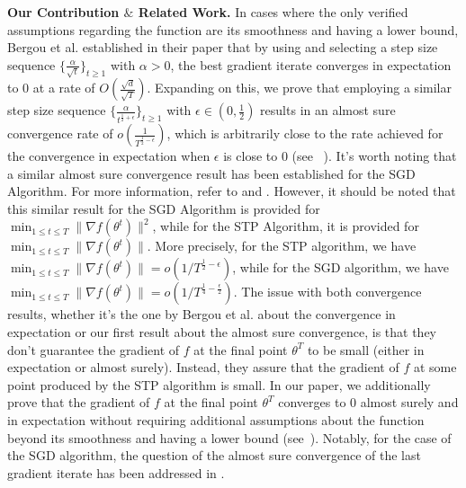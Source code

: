 \documentclass{article} %
\begin{document}
\textbf{Our Contribution $\&$ Related Work.}
In cases where the only verified assumptions regarding the function are its smoothness and having a lower bound, Bergou et al. established in their paper \cite[Theorem 4.1]{bergou2020stochastic} that by using  and selecting a step size sequence $\{\frac{\alpha}{\sqrt{t}}\}_{t \ge 1 }$ with $\alpha>0$, the best gradient iterate converges in expectation to $0$ at a rate of $O(\frac{\sqrt{d}}{\sqrt{T}}).$  Expanding on this, we prove that employing a similar step size sequence $\{\frac{\alpha}{t^{\frac{1}{2}+\epsilon} }\}_{t \ge 1}$ with $\epsilon \in (0,\frac{1}{2})$  results in an almost sure convergence rate of $o(\frac{1}{T^{\frac{1}{2}-\epsilon }} )  $, which is arbitrarily close to the rate achieved for the convergence in expectation when $\epsilon$ is close to $0$ (see ~). It's worth noting that a similar almost sure convergence result has been established for the SGD Algorithm. For more information, refer to \cite[Corollary 18]{sebbouh2021almost} and   \cite[Theorem 1]{liu2022almost}. However, it should be noted that this similar result for the SGD Algorithm is provided for $\min_{1 \le t \le T} \lVert \nabla f(\theta^t) \rVert^2$, while for the STP Algorithm, it is provided for $\min_{1 \le t \le T} \lVert \nabla f(\theta^t) \rVert$.  More precisely, for the STP algorithm, we have
$\min_{1 \le t \le T} \lVert \nabla f(\theta^t) \rVert=o(1/T^{ \frac{1}{2} - \epsilon})$, while for the SGD algorithm, we have $\min_{1 \le t \le T} \lVert \nabla f(\theta^t) \rVert=o(1/T^{ \frac{1}{4} - \frac{\epsilon}{2}} )$. The issue with both convergence results, whether it's the one by Bergou et al. \cite[Theorem 4.1]{bergou2020stochastic}  about the convergence in expectation or our first result about the almost sure convergence, is that they don't guarantee the gradient of $f$ at the final point $\theta^T$ to be small (either in expectation or almost surely). Instead, they assure that the gradient of $f$ at some point produced by the STP algorithm is small. In our paper, we additionally prove that the gradient of $f$ at the final point $\theta^T$ converges to $0$ almost surely and in expectation without requiring additional assumptions about the function beyond its smoothness and having a lower bound (see~). Notably, for the case of the SGD algorithm, the question of the almost sure convergence of the last gradient iterate has been addressed in \cite{bertsekas2000gradient}.
\end{document}
